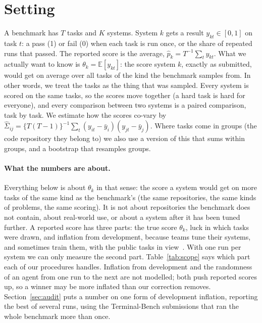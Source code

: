 \documentclass[11pt]{article}
\renewcommand{\hat}{\widehat}
\newcommand{\E}{\mathbb{E}}
\begin{document}
\section{Setting}\label{sec:setting}
A benchmark has $T$ tasks and $K$ systems.
System $k$ gets a result $y_{kt}\in[0,1]$ on task $t$: a pass (1) or fail (0) when each task is run once, or the share of repeated runs that passed.
The reported score is the average, $\hat p_k=T^{-1}\sum_t y_{kt}$.
What we actually want to know is $\theta_k=\E[y_{kt}]$: the score system $k$, exactly as submitted, would get on average over all tasks of the kind the benchmark samples from.
In other words, we treat the tasks as the thing that was sampled.
Every system is scored on the same tasks, so the scores move together (a hard task is hard for everyone), and every comparison between two systems is a paired comparison, task by task.
We estimate how the scores co-vary by $\hat\Sigma_{ij}=\{T(T-1)\}^{-1}\sum_t (y_{it}-\bar y_i)(y_{jt}-\bar y_j)$.
Where tasks come in groups (the code repository they belong to) we also use a version of this that sums within groups, and a bootstrap that resamples groups.

\paragraph{What the numbers are about.}
Everything below is about $\theta_k$ in that sense: the score a system would get on more tasks of the same kind as the benchmark's (the same repositories, the same kinds of problems, the same scoring).
It is not about repositories the benchmark does not contain, about real-world use, or about a system after it has been tuned further.
A reported score has three parts: the true score $\theta_k$, luck in which tasks were drawn, and inflation from development, because teams tune their systems, and sometimes train them, with the public tasks in view~\citep{singh2025illusion,yang2026hidden}.
With one run per system we can only measure the second part.
Table~\ref{tab:scope} says which part each of our procedures handles.
Inflation from development and the randomness of an agent from one run to the next are not modelled; both push reported scores up, so a winner may be more inflated than our correction removes.
Section~\ref{sec:audit} puts a number on one form of development inflation, reporting the best of several runs, using the Terminal-Bench submissions that ran the whole benchmark more than once.
\end{document}
